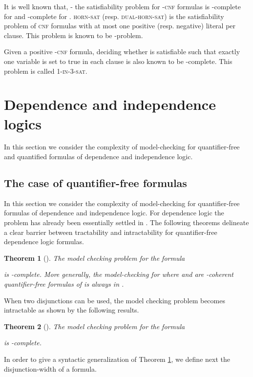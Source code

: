 \documentclass{article}
\theoremstyle{plain}
\newtheorem{theorem}{Theorem}
\theoremstyle{definition}
\newcommand{\pb}[1]{\textsc{#1}}
\begin{document}
It is well known that, - the satisfiability problem for -\pb{cnf} formulas is -complete for  and -complete for . \pb{horn-sat} (resp. \pb{dual-horn-sat}) is the satisfiability problem of \pb{cnf} formulas with at most one positive (resp. negative) literal per clause. This problem is known to be -problem.

Given a positive -\pb{cnf} formula, deciding whether  is satisfiable such that exactly one variable is set to true in each clause is also known to be -complete. This problem is called \pb{1-in-3-sat}.  


\section{Dependence and independence logics}In this section we consider the complexity of model-checking for quantifier-free and quantified  formulas of dependence and independence logic. 

\subsection{The case of quantifier-free formulas}
In this section we consider the complexity of model-checking for quantifier-free formulas of dependence and independence logic. For dependence logic the problem has  already been essentially settled in \cite{kontinenj13}.  The following theorems delineate a clear barrier between tractability and intractability for quantifier-free dependence logic formulas.
\begin{theorem}[\cite{kontinenj13}]\label{JarmoKontinenNL} The model checking problem for the formula 
 
is -complete. More generally, the model-checking for  where  and  are -coherent quantifier-free formulas of  is always in .
\end{theorem}

When  two disjunctions can be used, the model checking problem becomes intractable as shown by the following results.

\begin{theorem}[\cite{kontinenj13}]\label{JarmoKontinenNP}
The model checking problem for the formula 

 is -complete.
\end{theorem}




In order to give a syntactic generalization of  Theorem \ref{JarmoKontinenNL}, we define next the disjunction-width of a formula. 
\end{document}
